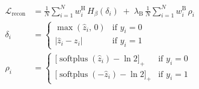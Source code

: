 \documentclass[border=2pt]{standalone}
\begin{document}
\color[HTML]{1F3342}
\(\displaystyle
\begin{aligned}
\mathcal{L}_{\mathrm{recon}}
&= \frac{1}{N}\sum_{i=1}^{N}
   w_{i}^{\mathrm{H}}\, H_{\beta}(\delta_{i})
   \;+\; \lambda_{\mathrm{B}}\,\frac{1}{N}\sum_{i=1}^{N}
   w_{i}^{\mathrm{B}}\,\rho_{i}\\
\delta_{i} &=
\begin{cases}
  \max(\widehat{z}_{i},\,0) & \text{if } y_{i} = 0\\
  \lvert \widehat{z}_{i} - z_{i}\rvert & \text{if } y_{i} = 1
\end{cases}\\
\rho_{i} &=
\begin{cases}
  \bigl[\operatorname{softplus}( \widehat{z}_{i}) - \ln 2\bigr]_{+} & \text{if } y_{i} = 0\\
  \bigl[\operatorname{softplus}(-\widehat{z}_{i}) - \ln 2\bigr]_{+} & \text{if } y_{i} = 1
\end{cases}
\end{aligned}
\)
\end{document}
